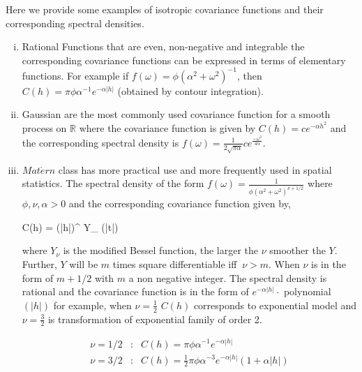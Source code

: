 Here we provide some examples of isotropic covariance functions and their corresponding spectral densities.
\begin{enumerate}[(i)]
	\item Rational Functions that are even,  non-negative and integrable the corresponding covariance functions can be expressed in terms of elementary functions. For example if $f(\omega) =\phi (\alpha^2+\omega^2)^{-1}$, then $C(h) = \pi\phi\alpha^{-1}e^{-\alpha|h|}$ (obtained by contour integration).
	
	\item Gaussian are the most commonly used covariance function for a smooth process on $\mathbb{R}$ where the covariance function is given by $C(h)=ce^{-\alpha h^2}$ and the corresponding spectral density is $ f(\omega) = \frac{1}{2\sqrt{\pi\alpha}}c e^{\frac{-\omega^2}{4\alpha}}$.

	
	\item $Mat\acute{e}rn$ class has more practical use and more frequently used in spatial statistics. The spectral density of the form $f(\omega) =\frac{1}{\phi(\alpha^2+\omega^2)^{\nu+1/2}}$ where $\phi,\nu,\alpha>0$ and the corresponding covariance function given by,
	
	      \beq
	      C(h) =  (\alpha|h|)^{\nu} Y_{\nu} (\alpha|t|)
	      \eeq
	
	      where $Y_{\nu}$ is the modified Bessel function, the larger the $\nu$ smoother the $Y$. Further, $Y$ will be $m$ times square differentiable iff $\ \nu>m$. When $\nu$ is in the form of $m+1/2$ with $m$ a non negative integer. The spectral density is rational and the covariance function is in the form of $e^{-\alpha|h|}\cdot$ polynomial$(|h|)$ for example, when $\nu=\frac{1}{2}$ $C(h)$ corresponds to exponential model and $\nu=\frac{3}{2}$ is transformation of exponential family of order 2.     
	
	      \begin{eqnarray*}
	      	\nu = 1/2 &:& C(h) = \pi\phi\alpha^{-1}e^{-\alpha|h|}\\
	      	\nu = 3/2 &:& C(h) = \frac{1}{2}\pi\phi\alpha^{-3}e^{-\alpha|h|}(1+\alpha|h|)\\
	      \end{eqnarray*}
	
\end{enumerate}

